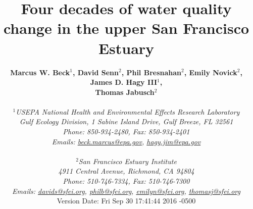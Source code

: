 \documentclass[letterpaper,12pt,oneside]{article}\usepackage[]{graphicx}\usepackage[]{color}
\begin{document}
\raggedbottom
\linenumbers
\raggedright
{}
\setlength{\parindent}{0.5in}
\renewcommand\refname{References \vspace{12pt}}

\begin{singlespace}
\title{{\bf {\Large Four decades of water quality change in the upper San Francisco Estuary}}}
\author{
  {\bf {\normalsize Marcus W. Beck$^1$, David Senn$^2$, Phil Bresnahan$^2$, Emily Novick$^2$, James D. Hagy III$^1$,}}
  \\{\bf {\normalsize Thomas Jabusch$^2$}}
  \\\\{\textit {\normalsize $^1$USEPA National Health and Environmental Effects Research Laboratory}}
  \\{\textit {\normalsize Gulf Ecology Division, 1 Sabine Island Drive, Gulf Breeze, FL 32561}}
	\\{\textit {\normalsize Phone: 850-934-2480, Fax: 850-934-2401}}
	\\{\textit {\normalsize Emails: \href{mailto:beck.marcus@epa.gov}{beck.marcus@epa.gov}, \href{mailto:hagy.jim@epa.gov}{hagy.jim@epa.gov}}}
  \\\\{\textit {\normalsize $^2$San Francisco Estuary Institute}}
	\\{\textit {\normalsize 4911 Central Avenue, Richmond, CA 94804}}
	\\{\textit {\normalsize Phone: 510-746-7334, Fax: 510-746-7300}}
	\\{\textit {\normalsize Emails: \href{mailto:davids@sfei.org}{davids@sfei.org}, \href{mailto:philb@sfei.org}{philb@sfei.org}, \href{mailto:emilyn@sfei.org}{emilyn@sfei.org}, \href{mailto:thomasj@sfei.org}{thomasj@sfei.org}}}
  \vspace{1in} 
  \\ Version Date:   Fri Sep 30 17:41:44 2016 -0500
	}
\date{}
\maketitle
\end{singlespace}
\clearpage
\end{document}
